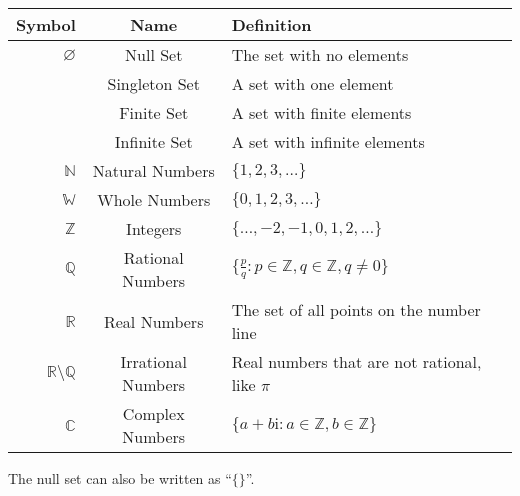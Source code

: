\medskip
\begin{tabular}{r|c|l}
	\hline
	Symbol & Name & Definition\\
	\hline
	$\varnothing$ & Null Set & The set with no elements\\
	 & Singleton Set & A set with one element\\
	 & Finite Set & A set with finite elements\\
	 & Infinite Set & A set with infinite elements\\
	$\mathbb{N}$ & Natural Numbers & $\{1,2,3,\dots\}$\\
	$\mathbb{W}$ & Whole Numbers & $\{0,1,2,3,\dots\}$\\
	$\mathbb{Z}$ & Integers & $\{\dots, -2, -1, 0, 1, 2, \dots\}$\\
	$\mathbb{Q}$ & Rational Numbers &
	$\displaystyle \bigg\{ \frac{p}{q} : p \in \mathbb{Z}, q \in \mathbb{Z}, q \neq 0 \bigg\}$\\
	$\mathbb{R}$ & Real Numbers & The set of all points on the number line\\
	$\mathbb{R}\setminus\mathbb{Q}$ & Irrational Numbers & Real numbers that are not rational, like $\pi$\\
	$\mathbb{C}$ & Complex Numbers & $\{a+b\mathrm{i} : a \in \mathbb{Z}, b \in \mathbb{Z}\}$\\
	\hline
\end{tabular}
\medskip

\begin{boxnotation*}{}{}
	The null set can also be written as ``$\{\}$''.
\end{boxnotation*}

